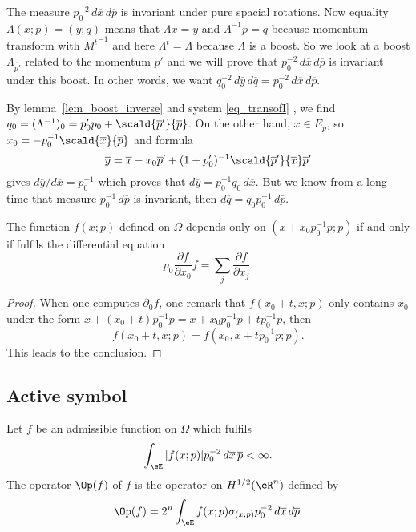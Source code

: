 The measure $p_0^{-2}\,d\overline{x}\,d\overline{p}$ is invariant under pure spacial rotations. Now equality $\Lambda(x;p)=(y;q)$ means that $\Lambda x=y$ and $\Lambda^{-1}p=q$ because momentum transform with ${M^t}^{-1}$ and here $\Lambda^t=\Lambda$ because $\Lambda$ is a boost. So we look at a boost $\Lambda_{\overline{p'}}$ related to the momentum $p'$ and we will prove that $p_0^{-2}\,d\overline{x}\,d\overline{p}$ is invariant under this boost. In other words, we want $q_0^{-2}\,d\overline{ y }\,d\overline{ q }=p_0^{-2}\,d\overline{x}\,d\overline{p}$.

By lemma~\ref{lem_boost_inverse} and system \eqref{eq_transofI} , we find $q_0=(\Lambda^{-1})_0=p'_0p_0+\scald{ \overline{p}' }{ \overline{p} }$. On the other hand, $x\in E_p$, so $x_0=-p_0^{-1}\scald{ \overline{x} }{ \overline{p} }$ and formula
\[
  \overline{ y }=\overline{x}-x_0\overline{p}'+(1+p'_0)^{-1}\scald{ \overline{p}' }{ \overline{x} }\overline{p}'
\]
gives $d\overline{ y }/d\overline{x}=p_0^{-1}$ which proves that $d\overline{ y }=p_0^{-1}q_0\,d\overline{x}$. But we know from a long time that measure $p_0^{-1}\,d\overline{p}$ is invariant, then $d\overline{ q }=q_0p_0^{-1}\,d\overline{p}$.

\begin{lemma}
 The function $f(x;p)$ defined on $\Omega$ depends only on $(\overline{x}+x_0p_0^{-1}\overline{p};p)$ if and only if fulfils the differential equation
\begin{equation}
  p_0\frac{ \partial f }{ \partial x_0 }f=\sum_j \frac{ \partial f }{ \partial x_j }.
\end{equation}

\end{lemma}


\begin{proof}
When one computes $\partial_0f$, one remark that $f(x_0+t,\overline{x};p)$ only contains $x_0$ under the form $\overline{x}+(x_0+t)p_0^{-1}\overline{p}=\overline{x}+x_0p_0^{-1}\overline{p}+tp_0^{-1}\overline{p}$, then
\[
  f(x_0+t,\overline{x};p)=f(x_0,\overline{x}+tp_0^{-1}\overline{p};p).
\]
This leads to the conclusion.
\end{proof}

\subsection{Active symbol}

Let $f$ be an admissible function on $\Omega$ which fulfils
\[
  \int_{\eE} | f(x;p) |p_0^{-2}\,d\overline{x}\,\overline{p}<\infty.
\]
The operator $\Op(f)$ of  $f$ is the operator on $H^{1/2}(\eR^n)$ defined by
\begin{equation}
  \Op(f)=2^n\int_{\eE} f(x;p)\sigma_{(x;p)}p_0^{-2}\,d\overline{x}\,d\overline{p}.
\end{equation}

